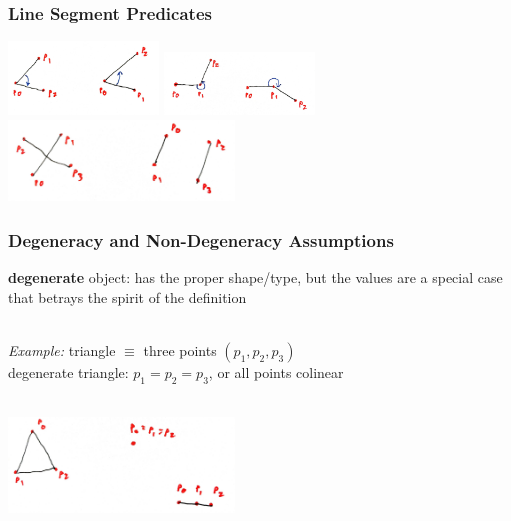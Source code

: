 \documentclass{beamer}
\newcommand{\stanza}{ \\~\ }
\begin{document}
\begin{frame} \frametitle{Line Segment Predicates}
  \begin{center}
    \includegraphics[width=4cm]{segment_clockwise.jpg}
    \hspace{2cm}
    \includegraphics[width=4cm]{segment_lr.jpg} \\

    \vspace{2cm}
    \includegraphics[width=6cm]{segment_intersect.jpg}
  \end{center}
\end{frame}
  
\begin{frame} \frametitle{Degeneracy and Non-Degeneracy Assumptions}
\textbf{degenerate} object: has the proper shape/type, but the values are a
  special case that betrays the spirit of the definition \stanza

\emph{Example:} triangle $\equiv$ three points $(p_1, p_2, p_3)$ \\
degenerate triangle: $p_1=p_2=p_3$, or all points colinear \stanza

  \begin{center}
    \includegraphics[width=6cm]{degenerate_triangle.jpg}
  \end{center}

\end{frame}
\end{document}
